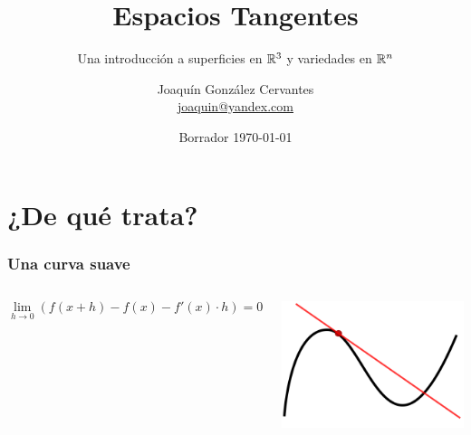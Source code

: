 \documentclass{beamer}
\title[Espacios Tangentes]{
    Espacios Tangentes}
\subtitle{Una introducción a superficies en $\mathbb{R}^{3}$ y variedades en $\mathbb{R}^{n}$}
\author[Joaquín González Cervantes]{
  Joaquín González Cervantes \\\medskip
  {\small \url{joaquin@yandex.com}}}
\institute[Universidad de Guadalajara]{}
\date[Borrador \today]{
  Borrador \today}
\begin{document}
\begin{frame}
  \titlepage
\end{frame}

\section{¿De qué trata?}

\begin{frame}
\frametitle{Una curva suave}
\begin{columns}

    $$\lim_{h \to 0} (f(x+h) - f(x) - f'(x) \cdot h) = 0$$

\includegraphics[scale=0.08]{curva-suave}
\end{columns}
\end{frame}
\end{document}
